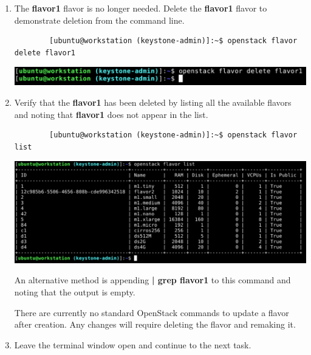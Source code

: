 \documentclass[letterpaper, 12pt]{article}
\begin{document}
\begin{enumerate}
    \item The \textbf{flavor1} flavor is no longer needed.
    Delete the \textbf{flavor1} flavor to demonstrate deletion from the command line.
    \begin{lstlisting}
        [ubuntu@workstation (keystone-admin)]:~$ openstack flavor delete flavor1
    \end{lstlisting}

    \begin{center}
        \includegraphics[width=\linewidth]{images/part2/step11.png}
    \end{center}

    \item Verify that the \textbf{flavor1} has been deleted by listing all the available flavors and noting that
    \textbf{flavor1} does not appear in the list.
    \begin{lstlisting}
        [ubuntu@workstation (keystone-admin)]:~$ openstack flavor list
    \end{lstlisting}

    \begin{center}
        \includegraphics[width=\linewidth]{images/part2/step12.png}
    \end{center}

    \begin{tipbox}
        An alternative method is appending \textbf{| grep flavor1} to this command and noting that the output is empty.
    \end{tipbox}

    \begin{notebox}
        There are currently no standard OpenStack commands to update a flavor after creation.
        Any changes will require deleting the flavor and remaking it.
    \end{notebox}

    \item Leave the terminal window open and continue to the next task.
\end{enumerate}
\end{document}
